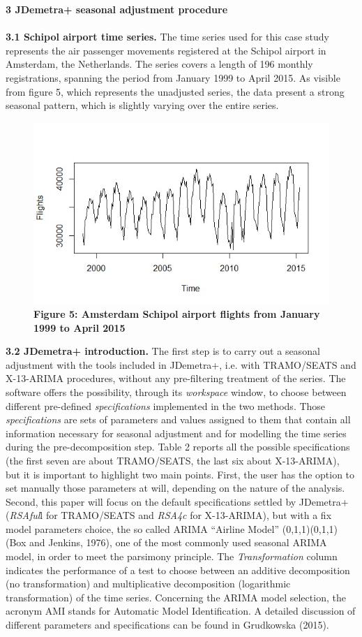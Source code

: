 \documentclass{article}
\begin{document}
\textbf{3 JDemetra+ seasonal adjustment procedure}\\
\bigskip\\
\textbf{\small 3.1 Schipol airport time series.}
The time series used for this case study represents the air passenger movements registered at the Schipol airport in Amsterdam, the Netherlands. The series covers a length of 196 monthly registrations, spanning the period from January 1999 to April 2015. As visible from figure 5, which represents the unadjusted series, the data present a strong seasonal pattern, which is slightly varying over the entire series.
\begin{figure}[H]
\centering
  \includegraphics[width=\linewidth]{../images/capitolo3/series.jpg}
  {\textbf{\scriptsize Figure 5: Amsterdam Schipol airport flights from January 1999 to April 2015}}
\end{figure}
\textbf{\small 3.2 JDemetra+ introduction.}
The first step is to carry out a seasonal adjustment with the tools included in JDemetra+, i.e. with TRAMO/SEATS and X-13-ARIMA procedures, without any pre-filtering treatment of the series. The software offers the possibility, through its \textit{workspace} window, to choose between different pre-defined \textit{specifications} implemented in the two methods. Those \textit{specifications} are sets of parameters and values assigned to them that contain all information necessary for seasonal adjustment and for modelling the time series during the pre-decomposition step. Table 2 reports all the possible specifications (the first seven are about TRAMO/SEATS, the last six about X-13-ARIMA), but it is important to highlight two main points. First, the user has the option to set manually those parameters at will, depending on the nature of the analysis. Second, this paper will focus on the default specifications settled by JDemetra+ (\textit{RSAful}l for TRAMO/SEATS and \textit{RSA4c} for X-13-ARIMA), but with a fix model parameters choice, the so called ARIMA ``Airline Model'' (0,1,1)(0,1,1) (Box and Jenkins, 1976), one of the most commonly used seasonal ARIMA model, in order to meet the parsimony principle. The \textit{Transformation} column indicates the performance of a test to choose between an additive decomposition (no transformation) and multiplicative decomposition (logarithmic transformation) of the time series. Concerning the ARIMA model selection, the acronym AMI stands for Automatic Model Identification. A detailed discussion of different parameters and specifications can be found in Grudkowska (2015).
\end{document}

